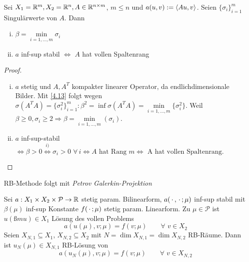 \begin{kor}
Sei $X_1 = \mathbb{R}^m, X_2 = \mathbb{R}^n, A \in \mathbb{R}^{n \times m}$, $m \leq n$ und $a(u,v) := \langle Au, v \rangle$. Seien $\{\sigma_i\}_{i=1}^m$ Singulärwerte von $A$. Dann
\begin{enumerate}[i)]
	\item $\beta = \min\limits_{i=1,\dots,m} \sigma_i$
	\item $a$ inf-sup stabil $\iff$ $A$ hat vollen Spaltenrang
\end{enumerate}
\begin{proof}
\begin{enumerate}[i)]
	\item $a$ stetig und $A, A^T$ kompakter linearer Operator, da endlichdimensionale  Bilder. Mit \ref{4.13} folgt wegen $\sigma(A^TA) = \{\sigma_i^2\}_{i=1}^m : \beta^2 = \inf \sigma(A^TA) = \min\limits_{i=1,\dots,m} \{\sigma_i^2\}$. Weil $\beta \geq 0, \sigma_i \geq 2 \Rightarrow \beta = \min\limits_{i=1,\dots,m} (\sigma_i)$.
	\item $a$ inf-sup-stabil $\iff \beta > 0 \overset{i)}{\iff} \sigma_i > 0 \,\, \forall \, i \iff A \text{ hat Rang } m \iff \text{ A hat vollen Spaltenrang.}$
\end{enumerate}
\end{proof}
\end{kor}

RB-Methode folgt mit \emph{Petrov Galerkin-Projektion}

\begin{defn} \label{4.15}
Sei $a: X_1 \times X_2 \times \mathcal{P} \rightarrow \mathbb{R}$ stetig param. Bilinearform, $a(\,\cdot\,,\,\cdot\,;\mu)$ inf-sup stabil mit $\beta(\mu)$ inf-sup Konstante $f(\,\cdot\,;\mu)$ stetig param. Linearform. Zu $\mu \in \mathcal{P}$ ist $u(ßmu) \in X_1$ Lösung des vollen Problems
\[
	a(u(\mu),v;\mu) = f(v;\mu) \qquad \forall \,\, v \in X_2
\]
Seien $X_{N,1} \subseteq X_1$, $X_{N,2} \subseteq X_2$ mit $N = \dim X_{N,1} = \dim X_{N,2}$ RB-Räume. Dann ist $u_N (\mu) \in X_{N,1}$ RB-Lösung von
\[
	a(u_N(\mu),v;\mu) = f(v;\mu) \qquad \forall \,\, v \in X_{N,2}
\]
\end{defn}

